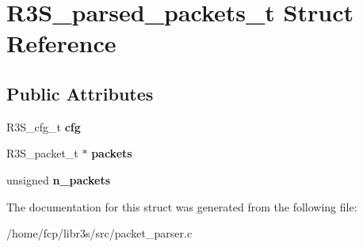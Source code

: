 \hypertarget{structR3S__parsed__packets__t}{}\section{R3\+S\+\_\+parsed\+\_\+packets\+\_\+t Struct Reference}
\label{structR3S__parsed__packets__t}
\subsection*{Public Attributes}
\begin{DoxyCompactItemize}
\item 
\mbox{\label{structR3S__parsed__packets__t_a803bb927da8890477645bd6adb7e3ae3}} 
R3\+S\+\_\+cfg\+\_\+t {\bfseries cfg}
\item 
\mbox{\label{structR3S__parsed__packets__t_acbcc82906dadd5f105bc276faa6da2f9}} 
R3\+S\+\_\+packet\+\_\+t $\ast$ {\bfseries packets}
\item 
\mbox{\label{structR3S__parsed__packets__t_a8d1c4747694dac26c6a4995131ae5614}} 
unsigned {\bfseries n\+\_\+packets}
\end{DoxyCompactItemize}


The documentation for this struct was generated from the following file\+:\begin{DoxyCompactItemize}
\item 
/home/fcp/libr3s/src/packet\+\_\+parser.\+c\end{DoxyCompactItemize}

